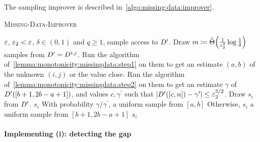 \noindent The sampling improver is described in~\autoref{algo:missing:data:improver}.
\begin{algorithm}\caption{\textsc{Missing-Data-Improver}}\label{algo:missing:data:improver}
\begin{algorithmic}[1]
  \Require $\varepsilon$, $\varepsilon_2 < \varepsilon$, $\delta \in (0,1)$ and $q\geq 1$, sample access to $D^\prime$.
  \Start{}
    \State Draw $m\eqdef\tildeTheta{\frac{1}{\eps_2^3}\log\frac{1}{\delta}}$ samples from $D^\prime=D^{i,j}$.
    \State Run the algorithm of~\autoref{lemma:monotonicity:missingdata:step1} on them to get an estimate $(a,b)$ of the unknown $(i,j)$ or the value \textsf{close}.
    \State Run the algorithm of~\autoref{lemma:monotonicity:missingdata:step2} on them to get an estimate $\gamma$ of $D^\prime([b+1,2b-a+1])$, and     values $c,\gamma^\prime$ such that $\left\lvert D^\prime([c,n])-\gamma^\prime \right\rvert\leq\varepsilon_2^{3/2}$.
  \End
  \Start{}
      \State Draw $s_i$ from $D^\prime$.
      \label{algo:step:already:close}
        \State \Return $s_i$ 
      \EndIf
        \State With probability $\gamma/\gamma^\prime$, \Return a uniform sample from $[a,b]$
        \State Otherwise, \Return $s_i$
        \State \Return a uniform sample from $[b+1,2b-a+1]$ 
      \Else
        \State \Return $s_i$ 
      \EndIf
    \EndFor
  \End
\end{algorithmic}
\end{algorithm}

\paragraph{Implementing \textsf{(i)}: detecting the gap}

